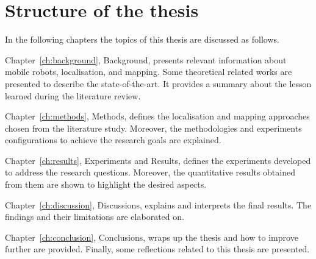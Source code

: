 \section{Structure of the thesis}
\noindent In the following chapters the topics of this thesis are discussed as follows.


Chapter~\ref{ch:background}, Background, presents relevant information about mobile robots, localisation, and mapping.
Some theoretical related works are presented to describe the state-of-the-art.
It provides a summary about the lesson learned during the literature review.

Chapter~\ref{ch:methods}, Methods, defines the localisation and mapping approaches chosen from the literature study.
Moreover, the methodologies and experiments configurations to achieve the research goals are explained.


Chapter~\ref{ch:results}, Experiments and Results, defines the experiments developed to address the research questions.
Moreover, the quantitative results obtained from them are shown to highlight the desired aspects.

Chapter~\ref{ch:discussion}, Discussions, explains and interprets the final results.
The findings and their limitations are elaborated on.

Chapter~\ref{ch:conclusion}, Conclusions, wraps up the thesis and  how to improve further are provided.
Finally, some reflections related to this thesis are presented.


\cleardoublepage
